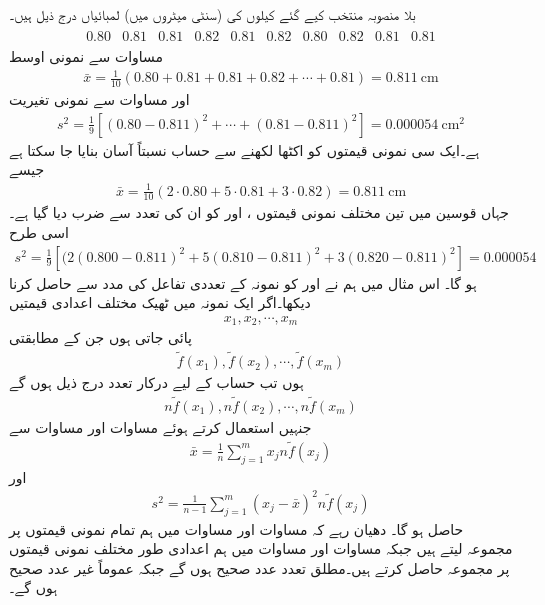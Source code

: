 \quad {}\\
بلا منصوبہ منتخب کیے گئے کیلوں کی  (سنٹی میٹروں میں) لمبائیاں درج ذیل ہیں۔
\begin{align*}
\begin{array}{cccccccccc}
0.80&0.81&0.81&0.82&0.81&0.82&0.80&0.82&0.81&0.81
\end{array}
\end{align*}
مساوات  سے نمونی اوسط
\begin{align*}
\bar{x}=\frac{1}{10}(0.80+0.81+0.81+0.82+\cdots+0.81)=\SI{0.811}{\centi\meter}
\end{align*}
اور مساوات  سے نمونی تغیریت
\begin{align*}
s^2=\frac{1}{9}[(0.80-0.811)^2+\cdots+(0.81-0.811)^2]=\SI{0.000054}{\centi\meter\squared}
\end{align*}
ہے۔ایک سی نمونی قیمتوں کو اکٹھا لکھنے سے حساب نسبتاً آسان بنایا جا سکتا ہے جیسے
\begin{align*}
\bar{x}=\frac{1}{10}(2\cdot 0.80+5\cdot 0.81+3\cdot 0.82)=\SI{0.811}{\centi\meter}
\end{align*} 
جہاں قوسین میں تین مختلف نمونی قیمتوں ،  اور  کو ان کی تعدد سے ضرب دیا گیا ہے۔اسی طرح
\begin{align*}
s^2=\frac{1}{9}[(2(0.800-0.811)^2+5(0.810-0.811)^2+3(0.820-0.811)^2]=\num{0.000054}
\end{align*}
ہو گا۔
اس مثال میں ہم نے  اور  کو نمونہ کے تعددی تفاعل  کی مدد سے حاصل کرنا دیکھا۔اگر ایک نمونہ میں ٹھیک  مختلف اعدادی قیمتیں 
\begin{align*}
x_1, x_2,\cdots, x_m
\end{align*}
پائی جاتی ہوں جن کے مطابقتی 
\begin{align*}
\tilde{f}(x_1),\tilde{f}(x_2),\cdots,\tilde{f}(x_m)
\end{align*}
ہوں تب حساب کے لیے درکار تعدد درج ذیل ہوں گے
\begin{align*}
n\tilde{f}(x_1),n\tilde{f}(x_2),\cdots,n\tilde{f}(x_m)
\end{align*}
جنہیں استعمال کرتے ہوئے مساوات  اور مساوات  سے
\begin{align}\label{مساوات_شماریات_نمونی_اوسط_پ}
\bar{x}=\frac{1}{n}\sum_{j=1}^{m}x_jn\tilde{f}(x_j)
\end{align}
اور
\begin{align}\label{مساوات_شماریات_نمونی_اوسط_ت}
s^2=\frac{1}{n-1}\sum_{j=1}^{m} (x_j-\bar{x})^2n\tilde{f}(x_j)
\end{align}
حاصل ہو گا۔ دھیان رہے کہ مساوات  اور مساوات  میں ہم تمام نمونی قیمتوں پر مجموعہ لیتے ہیں جبکہ مساوات  اور مساوات  میں ہم اعدادی طور مختلف نمونی قیمتوں پر مجموعہ حاصل کرتے ہیں۔مطلق تعدد  عدد صحیح ہوں گے جبکہ   عموماً غیر عدد صحیح ہوں گے۔

